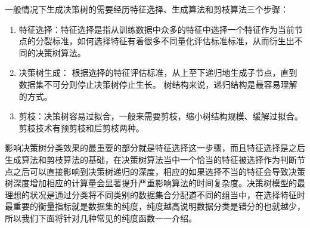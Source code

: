一般情况下生成决策树的需要经历特征选择、生成算法和剪枝算法三个步骤：
\begin{enumerate}
    \item 特征选择：特征选择是指从训练数据中众多的特征中选择一个特征作为当前节点的分裂标准，如何选择特征有着很多不同量化评估标准标准，从而衍生出不同的决策树算法。
    \item 决策树生成： 根据选择的特征评估标准，从上至下递归地生成子节点，直到数据集不可分则停止决策树停止生长。 树结构来说，递归结构是最容易理解的方式。
    \item 剪枝：决策树容易过拟合，一般来需要剪枝，缩小树结构规模、缓解过拟合。剪枝技术有预剪枝和后剪枝两种。
\end{enumerate}

影响决策树分类效果的最重要的部分就是特征选择这一步骤，而且特征选择是之后生成算法和剪枝算法的基础，在决策树算法当中一个恰当的特征被选择作为判断节点之后可以直接影响到决策树递归的深度，相应的如果选择不当的特征会导致决策树深度增加相应的计算量会显著提升严重影响算法的时间复杂度。决策树模型的最理想的状况是通过分类将不同类别的数据集合分配道不同的组当中，在选择特征时最重要的衡量指标就是数据集的纯度，纯度越高说明数据分类是错分的也就越少，所以我们下面将针对几种常见的纯度函数一一介绍。

